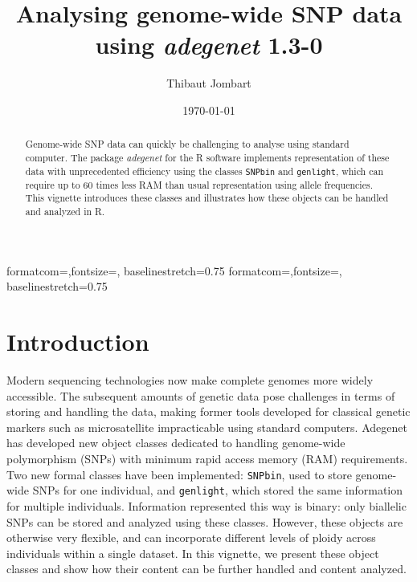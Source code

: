 \documentclass{article}
\title{Analysing genome-wide SNP data using  \textit{adegenet} 1.3-0}
\author{Thibaut Jombart}
\date{\today}
\begin{document}
{formatcom={\color{Sinput}},fontsize=\footnotesize, baselinestretch=0.75}
{formatcom={\color{Soutput}},fontsize=\footnotesize, baselinestretch=0.75}

\color{black}

\maketitle

\begin{abstract}
  Genome-wide SNP data can quickly be challenging to analyse using standard
  computer. The package \textit{adegenet} \cite{tjart05} for the R software \cite{np145}
  implements representation of these data with unprecedented efficiency
  using the classes \texttt{SNPbin} and \texttt{genlight}, which can require up to 60 times less RAM than usual
  representation using allele frequencies.
  This vignette introduces these classes and illustrates how these objects can be handled and
  analyzed in R.
\end{abstract}

\newpage

\tableofcontents


\newpage
\section{Introduction}
Modern sequencing technologies now make complete genomes more widely accessible.
The subsequent amounts of genetic data pose challenges in terms of storing and handling the data,
making former tools developed for classical genetic markers such as microsatellite impracticable using
standard computers.
Adegenet has developed new object classes dedicated to handling genome-wide polymorphism (SNPs) with
minimum rapid access memory (RAM) requirements.
\\

Two new formal classes have been implemented: \texttt{SNPbin}, used to store genome-wide SNPs for
one individual, and \texttt{genlight}, which stored the same information for multiple individuals.
Information represented this way is binary: only biallelic SNPs can be stored and analyzed using these classes.
However, these objects are otherwise very flexible, and can incorporate different levels of ploidy
across individuals within a single dataset.
In this vignette, we present these object classes and show how their content can be further handled and
content analyzed.
\end{document}
